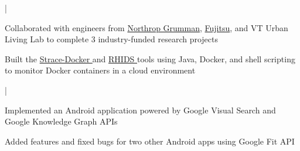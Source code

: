  |
\begin{tightemize}
\item{Collaborated with engineers from \href{https://www.northropgrumman.com}{Northrop Grumman}, \href{https://www.fujitsu.com}{Fujitsu}, and VT Urban Living Lab to complete 3 industry-funded research projects}
\item{Built the \href{https://github.com/amrabed/strace-docker}{Strace-Docker \faGithub} and \href{https://github.com/amrabed/rhids}{RHIDS \faGithub} tools using Java, Docker, and shell scripting to monitor Docker containers in a cloud environment}
\end{tightemize}
\sectionsep


 |
\begin{tightemize}
\item{Implemented an Android application powered by Google Visual Search and Google Knowledge Graph APIs}
\item{Added features and fixed bugs for two other Android apps using Google Fit API}
\end{tightemize}
\sectionsep
